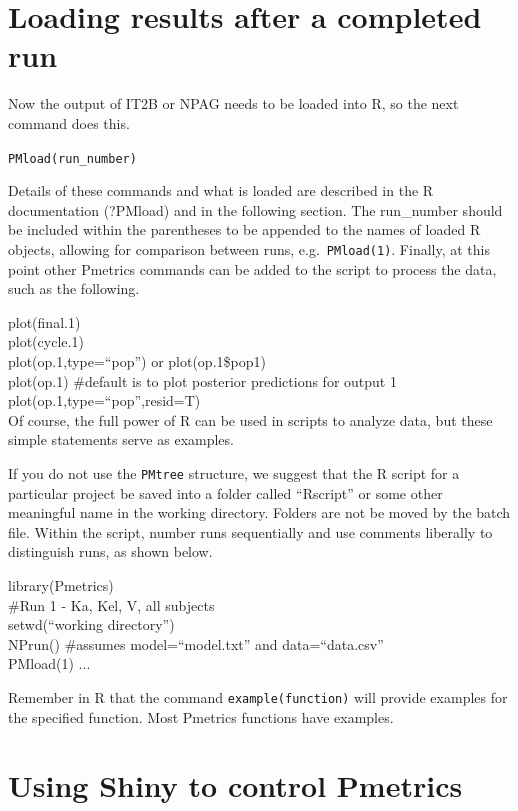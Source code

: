 \documentclass[
]{book}
\begin{document}
\hypertarget{loading-results-after-a-completed-run}{%
\section{Loading results after a completed run}\label{loading-results-after-a-completed-run}}

Now the output of IT2B or NPAG needs to be loaded into R, so the next
command does this.

\texttt{PMload(run\_number)}

Details of these commands and what is loaded are described in the R
documentation (?PMload) and in the following section. The run\_number
should be included within the parentheses to be appended to the names of
loaded R objects, allowing for comparison between runs, e.g.~\texttt{PMload(1)}.
Finally, at this point other Pmetrics commands can be added to the
script to process the data, such as the following.

plot(final.1)\\
plot(cycle.1)\\
plot(op.1,type=``pop'') or plot(op.1\$pop1)\\
plot(op.1) \#default is to plot posterior predictions for output 1\\
plot(op.1,type=``pop'',resid=T)\\

Of course, the full power of R can be used in scripts to analyze data,
but these simple statements serve as examples.

If you do not use the \texttt{PMtree} structure, we suggest that the R script
for a particular project be saved into a folder called ``Rscript'' or some
other meaningful name in the working directory. Folders are not be moved
by the batch file. Within the script, number runs sequentially and use
comments liberally to distinguish runs, as shown below.

library(Pmetrics)\\
\#Run 1 - Ka, Kel, V, all subjects\\
setwd(``working directory'')\\
NPrun() \#assumes model=``model.txt'' and data=``data.csv''\\
PMload(1)
...

Remember in R that the command \texttt{example(function)} will provide examples
for the specified function. Most Pmetrics functions have examples.

\hypertarget{using-shiny-to-control-pmetrics}{%
\section{Using Shiny to control Pmetrics}\label{using-shiny-to-control-pmetrics}}
\end{document}
